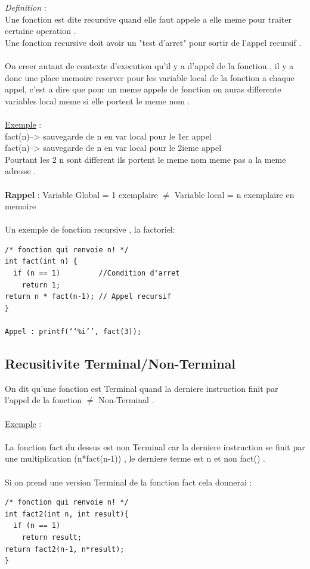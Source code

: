 \documentclass[a4paper,12pt,openany]{book}
\begin{document}
{\emph{Definition} : \\
Une fonction est dite recursive quand elle faut appele a elle meme pour traiter certaine operation .\\
Une fonction recursive doit avoir un "test d'arret" pour sortir de l'appel recursif .\\
\\
On creer autant de contexte d'execution qu'il y a d'appel de la fonction , il y a donc une place  memoire reserver pour les variable local de la fonction a chaque appel, c'est a dire que pour un  meme appele de fonction on auras differente variables local meme si elle portent le meme nom .\\
\\
\underline{Exemple} : \\
fact(n)--> sauvegarde de n en var local pour le 1er appel\\
fact(n)--> sauvegarde de n en var local pour le 2ieme appel\\
Pourtant les 2 n sont different ils portent le meme nom meme pas a la meme adresse .\\ 
\\
\textbf{Rappel} : Variable Global = 1 exemplaire $\neq$ Variable local = n exemplaire en memoire \\
\\
Un exemple de fonction recursive , la factoriel: \\
\begin{verbatim}
/* fonction qui renvoie n! */
int fact(int n) {
  if (n == 1)         //Condition d'arret
    return 1;
return n * fact(n-1); // Appel recursif
}

Appel : printf(‘‘%i’’, fact(3));
\end{verbatim}



\subsection{Recusitivite Terminal/Non-Terminal}
On dit qu'une fonction est Terminal quand la derniere instruction finit par l'appel de la fonction $\neq$ Non-Terminal .\\
\\
\underline{Exemple} : \\
\\
La fonction fact du dessus est non Terminal car la derniere instruction se finit par une multiplication (n*fact(n-1)) , le derniere terme est n et non fact() .\\
\\
Si on prend une version Terminal de la fonction fact cela donnerai : \\
\begin{verbatim}
/* fonction qui renvoie n! */
int fact2(int n, int result){
  if (n == 1)
    return result;
return fact2(n-1, n*result);
}


\end{verbatim}}
\end{document}
